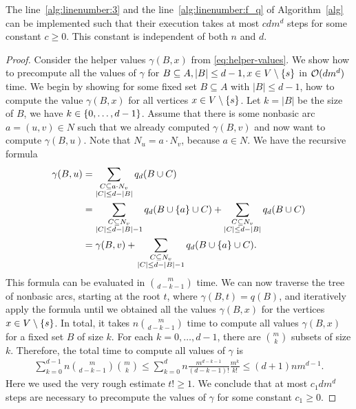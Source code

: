  
\begin{lemma}
\label{lemma:faster-reduction}
The line~\ref{alg:linenumber:3} and the line~\ref{alg:linenumber:f_q} of Algorithm~\ref{alg} can be implemented such that their execution takes at most $c d m^d$ steps for some constant $c \geq 0$. This constant is independent of both $n$ and $d$.
\end{lemma}
\begin{proof}
    Consider the helper values $\gamma(B,x)$ from \cref{eq:helper-values}.
    We show how to precompute all the values of $\gamma$ for $B \subseteq A, |B| \leq d-1, x \in V \setminus \{ s \}$ in $\mathcal{O}(dm^d)$ time. We begin by showing for some fixed set $B \subseteq A$ with $|B| \leq d-1$, how to compute the value $\gamma(B, x)$ for all vertices $x \in V\setminus\{ s \}$. Let $k = |B|$ be the size of $B$, we have $k \in \{ 0, \ldots, d-1 \}$. Assume that there is some nonbasic arc $a = (u, v) \in N$ such that we already computed $\gamma(B, v)$ and now want to compute $\gamma(B,u)$. Note that $N_u = a \cdot N_v$, because $a \in N$. We have the recursive formula
    \begin{align}
        \gamma(B, u) &= \sum_{\substack{C \subseteq a \cdot N_v\\ |C| \leq d - |B|}}q_d(B \cup C) \nonumber\\
        &=  \sum_{\substack{C \subseteq N_v\\ |C| \leq d - |B| - 1}}q_d(B \cup \{ a \} \cup C) + \sum_{\substack{C \subseteq N_v\\ |C| \leq d - |B|}}q_d(B \cup C)\nonumber\\
        &=  \gamma(B, v) + \sum_{\substack{C \subseteq N_v\\ |C| \leq d - |B| - 1}}q_d(B \cup \{ a \} \cup C). \label{eq:recursive-gammma}
    \end{align}
    This formula can be evaluated in $\binom{m}{{d - k - 1}}$ time. We can now traverse the tree of nonbasic arcs, starting at the root $t$, where $\gamma(B, t) = q(B)$, and iteratively apply the formula until we obtained all the values $\gamma(B, x)$ for the vertices $x \in V \setminus \{ s \}$.
    In total, it takes $n\binom{m}{{d - k - 1}}$ time to compute all values $\gamma(B, x)$ for a fixed set $B$ of size $k$. For each $k = 0,\dots,d-1$, there are $\binom{m}{k}$ subsets of size $k$. Therefore, the total time to compute all values of $\gamma$ is
    \begin{align*}
        \sum_{k=0}^{d-1} n\binom{m}{d - k - 1}\binom{m}{k} \leq \sum_{k=0}^d n\frac{m^{d-k-1}}{(d-k-1)!} \frac{m^k}{k!} \leq (d+1) nm^{d-1}.
    \end{align*}
    Here we used the very rough estimate $t! \geq 1$. We conclude that at most $c_1dm^d$ steps are necessary to precompute the values of $\gamma$ for some constant $c_1 \geq 0$.
    

\end{proof}
